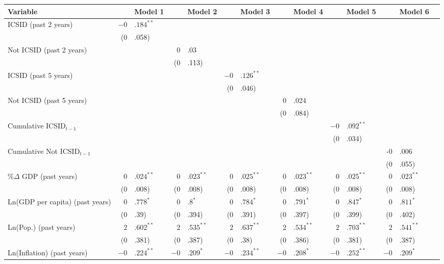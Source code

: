 \begin{table}[ht]
\centering
\begingroup\footnotesize
\begin{tabular}{lr@{} lr@{}lr@{}lr@{} lr@{}lr@{}lr@{}}
Variable && Model 1 && Model 2 && Model 3 && Model 4 && Model 5 && Model 6 \\ 
  \hline
\hline
ICSID (past 2 years) & $-0$&$.184^{\ast\ast}$ &&  &&  &&  &&  &&  \\ 
   & (0&.058) &&  &&  &&  &&  &&  \\ 
  Not ICSID (past 2 years) &  && 0&.03 &&  &&  &&  &&  \\ 
   &  && (0&.113) &&  &&  &&  &&  \\ 
  ICSID (past 5 years) &  &&  && $-0$&$.126^{\ast\ast}$ &&  &&  &&  \\ 
   &  &&  && (0&.046) &&  &&  &&  \\ 
  Not ICSID (past 5 years) &  &&  &&  && 0&.024 &&  &&  \\ 
   &  &&  &&  && (0&.084) &&  &&  \\    
  Cumulative ICSID$_{t-1}$ &  &&  &&  &&  && $-0$&$.092^{\ast\ast}$ &&  \\ 
   &  &&  &&  &&  && (0&.034) &&  \\ 
  Cumulative Not ICSID$_{t-1}$ &  &&  &&  &&  &&  && -0&.006 \\ 
   &  &&  &&  &&  &&  && (0&.055) \\ 
  \%$\Delta$ GDP (past  years) & $0$&$.024^{\ast\ast}$ & $0$&$.023^{\ast\ast}$ & $0$&$.025^{\ast\ast}$ & $0$&$.023^{\ast\ast}$ & $0$&$.025^{\ast\ast}$ & $0$&$.023^{\ast\ast}$ \\ 
   & (0&.008) & (0&.008) & (0&.008) & (0&.008) & (0&.008) & (0&.008) \\ 
  Ln(GDP per capita) (past  years) & $0$&$.778^{\ast}$ & $0$&$.8^{\ast}$ & $0$&$.784^{\ast}$ & $0$&$.791^{\ast}$ & $0$&$.847^{\ast}$ & $0$&$.811^{\ast}$ \\ 
   & (0&.39) & (0&.394) & (0&.391) & (0&.397) & (0&.399) & (0&.402) \\ 
  Ln(Pop.) (past  years) & $2$&$.602^{\ast\ast}$ & $2$&$.535^{\ast\ast}$ & $2$&$.637^{\ast\ast}$ & $2$&$.534^{\ast\ast}$ & $2$&$.703^{\ast\ast}$ & $2$&$.541^{\ast\ast}$ \\ 
   & (0&.381) & (0&.387) & (0&.38) & (0&.386) & (0&.381) & (0&.387) \\ 
  Ln(Inflation) (past  years) & $-0$&$.224^{\ast\ast}$ & $-0$&$.209^{\ast}$ & $-0$&$.234^{\ast\ast}$ & $-0$&$.208^{\ast}$ & $-0$&$.252^{\ast\ast}$ & $-0$&$.209^{\ast}$ \\ 

\end{tabular}
\end{table}
